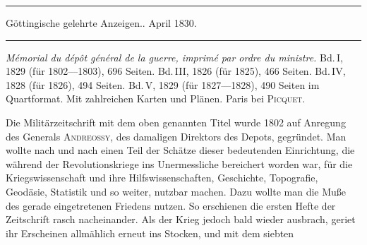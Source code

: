 \begin{center}
\rule{.85\textwidth}{.3pt}\par
Göttingische gelehrte Anzeigen.. April 1830.\par
\rule{.85\textwidth}{.3pt}
\end{center}
\hspace*{\parindent}\textit{Mémorial du dépôt général de la guerre, imprimé par ordre du ministre.} Bd.\,I, 1829 (für 1802---1803), 696 Seiten. Bd.\,III, 1826 (für 1825), 466 Seiten. Bd.\,IV, 1828 (für 1826), 494 Seiten. Bd.\,V, 1829 (für 1827---1828), 490 Seiten im Quartformat. Mit zahlreichen Karten und Plänen. Paris bei \textsc{Picquet}.

Die Militärzeitschrift mit dem oben genannten Titel wurde 1802 auf Anregung des Generals \textsc{Andreossy}, des damaligen Direktors des Depots, gegründet. Man wollte nach und nach einen Teil der Schätze dieser bedeutenden Einrichtung, die während der Revolutionskriege ins Unermessliche bereichert worden war, für die Kriegswissenschaft und ihre Hilfswissenschaften, Geschichte, Topografie, Geodäsie, Statistik und so weiter, nutzbar machen. Dazu wollte man die Muße des gerade eingetretenen Friedens nutzen. So erschienen die ersten Hefte der Zeitschrift rasch nacheinander. Als der Krieg jedoch bald wieder ausbrach, geriet ihr Erscheinen allmählich erneut ins Stocken, und mit dem siebten
